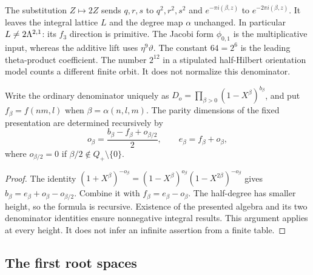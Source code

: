 \begin{remark}
\label{rem:bkm-doubling-Z}
The substitution $Z\mapsto2Z$ sends $q,r,s$ to $q^2,r^2,s^2$
and $e^{-\pi i(\beta,z)}$ to $e^{-2\pi i(\beta,z)}$.
It leaves the integral lattice $L$ and the degree map $\alpha$
unchanged. In particular $L\ne2\Lambda^{2,1}$: its $f_3$ direction
is primitive. The Jacobi form $\phi_{0,1}$ is the multiplicative
input, whereas the additive lift uses $\eta^9\vartheta$.
\label{rem:bkm-doubling-power-of-two}
The constant $64=2^6$ is the leading theta-product coefficient.
The number $2^{12}$ in a stipulated half-Hilbert orientation
model counts a different finite orbit. It does not normalize this
denominator.
\end{remark}

\begin{proposition}
\label{prop:bkm-all-height-parities}
Write the ordinary denominator uniquely as
$D_o=\prod_{\beta>0}(1-X^\beta)^{b_\beta}$, and put
$f_\beta=f(nm,l)$ when $\beta=\alpha(n,l,m)$.
The parity dimensions of the fixed presentation are determined
recursively by
\begin{equation}
\label{eq:bkm-parity-recursion}
 o_\beta=\frac{b_\beta-f_\beta+o_{\beta/2}}2,
 \qquad e_\beta=f_\beta+o_\beta,
\end{equation}
where $o_{\beta/2}=0$ if $\beta/2\notin Q_+\setminus\{0\}$.
\end{proposition}
\begin{proof}
The identity
$(1+X^\beta)^{-o_\beta}
 =(1-X^\beta)^{o_\beta}(1-X^{2\beta})^{-o_\beta}$ gives
$b_\beta=e_\beta+o_\beta-o_{\beta/2}$.
Combine it with $f_\beta=e_\beta-o_\beta$.
The half-degree has smaller height, so the formula is recursive.
Existence of the presented algebra and its two denominator identities
ensure nonnegative integral results. This argument applies at every
height. It does not infer an infinite assertion from a finite table.
\end{proof}

\subsection{The first root spaces}

